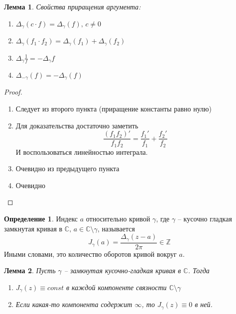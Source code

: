 \documentclass[a4paper,12pt]{article}
\theoremstyle{plain}
\newtheorem{lemma}{Лемма}[section]
\theoremstyle{definition}
\newtheorem{definition}{Определение}[section]
\theoremstyle{remark}
\begin{document}
\begin{lemma}
	Свойства приращения аргумента:
	\begin{enumerate}
		\item $\Delta_\gamma(c\cdot f) = \Delta_\gamma(f),\, c \neq 0$
		\item $\Delta_\gamma(f_1\cdot f_2) = \Delta_\gamma(f_1) + \Delta_\gamma(f_2)$
		\item $\Delta_\gamma\frac{1}{f} = -\Delta_\gamma f$
		\item $\Delta_{-\gamma}(f) = -\Delta_\gamma(f)$
	\end{enumerate}
\end{lemma}

\begin{proof}
	\begin{enumerate}
		\item Следует из второго пункта (приращение константы равно нулю)
		\item Для доказательства достаточно заметить
		      \[
			      \frac{(f_1f_2)'}{f_1f_2} = \frac{f_1'}{f_1} +
			      \frac{f_2'}{f_2}
		      \]
		      И воспользоваться линейностью интеграла.
		\item Очевидно из предыдущего пункта
		\item Очевидно
	\end{enumerate}
\end{proof}

\begin{definition}
	Индекс $a$ относительно кривой $\gamma$, где $\gamma$ -- кусочно гладкая замкнутая кривая в $\mathbb{C},\, a \in \mathbb{C} \setminus \gamma$, называется
	\[
		J_\gamma(a) = \frac{\Delta_\gamma(z - a)}{2\pi} \in \mathbb{Z}
	\]
	Иными словами, это количество оборотов кривой вокруг $a$.
\end{definition}

\begin{lemma}
	Пусть $\gamma$ -- замкнутая кусочно-гладкая кривая в $\mathbb{C}$. Тогда
	\begin{enumerate}
		\item $J_\gamma(z) \equiv const$ в каждой компоненте связности $\mathbb{C}\setminus\gamma$
		\item Если какая-то компонента содержит $\infty$, то $J_\gamma(z) \equiv 0$ в ней.
	\end{enumerate}
\end{lemma}
\end{document}
